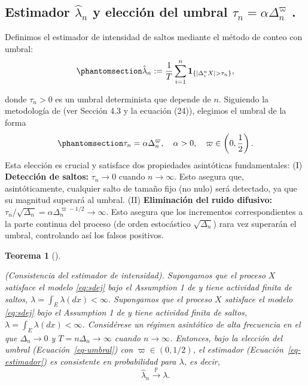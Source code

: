 \documentclass[
  spanish,
  us-letterpaper,
]{scrreprt}
\theoremstyle{plain}
\newtheorem{theorem}{Teorema}[chapter]
\theoremstyle{plain}
\theoremstyle{definition}
\theoremstyle{remark}
\begin{document}
\subsection{\texorpdfstring{Estimador \(\hat{\lambda}_n\) y elección del
umbral \(\tau_n = \alpha \Delta_n^{\varpi}\)
.}{Estimador \textbackslash hat\{\textbackslash lambda\}\_n y elección del umbral \textbackslash tau\_n = \textbackslash alpha \textbackslash Delta\_n\^{}\{\textbackslash varpi\} .}}\label{estimador-hatlambda_n-y-elecciuxf3n-del-umbral-tau_n-alpha-delta_nvarpi-.}

Definimos el estimador de intensidad de saltos mediante el método de
conteo con umbral:
\begin{equation}\protect\phantomsection\label{eq-umbral}{\hat{\lambda}_n := \frac{1}{T} \sum_{i=1}^n \mathbf{1}_{\{ |\Delta_i^n X| > \tau_n \}},}\end{equation}

donde \(\tau_n > 0\) es un umbral determinista que depende de \(n\).
Siguiendo la metodología de \cite{ait2009testing} (ver Sección 4.3 y la
ecuación (24)), elegimos el umbral de la forma
\begin{equation}\protect\phantomsection\label{eq-estimador}{ \tau_n = \alpha \Delta_n^{\varpi}, \quad \alpha > 0, \quad \varpi \in \left(0, \frac{1}{2}\right).
 }\end{equation} Esta elección es crucial y satisface dos propiedades
asintóticas fundamentales: (I) \textbf{Detección de saltos:}
\(\tau_n \to 0\) cuando \(n \to \infty\). Esto asegura que,
asintóticamente, cualquier salto de tamaño fijo (no nulo) será
detectado, ya que su magnitud superará al umbral. (II)
\textbf{Eliminación del ruido difusivo:}
\(\tau_n / \sqrt{\Delta_n} = \alpha \Delta_n^{\varpi - 1/2} \to \infty\).
Esto asegura que los incrementos correspondientes a la parte continua
del proceso (de orden estocástico \(\sqrt{\Delta_n}\)) rara vez
superarán el umbral, controlando así los falsos positivos.

\begin{theorem}[]\protect\hypertarget{thm-Consistencia_estimador_intensidad}{}\label{thm-Consistencia_estimador_intensidad}

(Consistencia del estimador de intensidad). Supongamos que el proceso
\(X\) satisface el modelo \eqref{eq:sdej} bajo el Assumption 1 de
\cite{ait2009testing} y tiene actividad finita de saltos,
\(\lambda = \int_E \lambda(dx) < \infty\). Supongamos que el proceso
\(X\) satisface el modelo \eqref{eq:sdej} bajo el Assumption 1 de
\cite{ait2009testing} y tiene actividad finita de saltos,
\(\lambda = \int_E \lambda(dx) < \infty\). Considérese un régimen
asintótico de alta frecuencia en el que \(\Delta_n \to 0\) y
\(T = n \Delta_n \to \infty\) cuando \(n \to \infty\). Entonces, bajo la
elección del umbral (Ecuación~\ref{eq-umbral}) con
\(\varpi \in (0, 1/2)\), el estimador (Ecuación~\ref{eq-estimador}) es
consistente en probabilidad para \(\lambda\), es decir,
\[\hat{\lambda}_n \xrightarrow{\mathbb{P}} \lambda.\]

\end{theorem}
\end{document}
